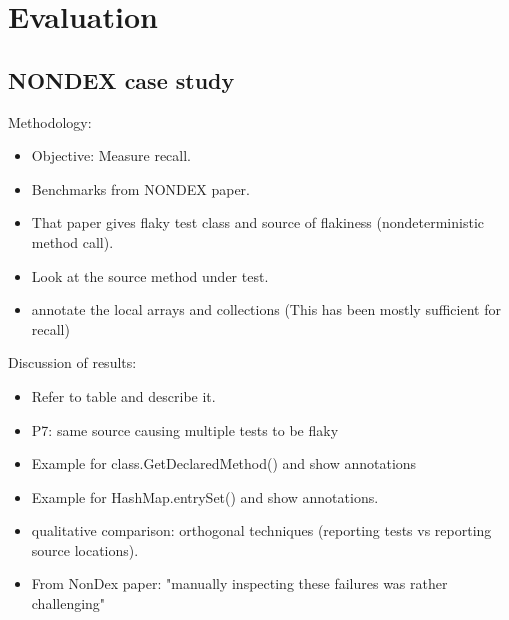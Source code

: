 \section{Evaluation}
\subsection{NONDEX case study}
Methodology:
\begin{itemize}
    \item Objective: Measure recall.
    \item Benchmarks from NONDEX paper.
    \item That paper gives flaky test class and source of flakiness (nondeterministic method call).
    \item Look at the source method under test.
    \item annotate the local arrays and collections (This has been mostly sufficient for recall)
\end{itemize}

Discussion of results:

\begin{itemize}
    \item Refer to table and describe it.
    \item P7: same source causing multiple tests to be flaky
    \item Example for class.GetDeclaredMethod() and show annotations
    \item Example for HashMap.entrySet() and show annotations.
    \item qualitative comparison: orthogonal techniques (reporting tests vs reporting source locations).
    \item From NonDex paper: "manually inspecting these failures was rather challenging"
\end{itemize}

